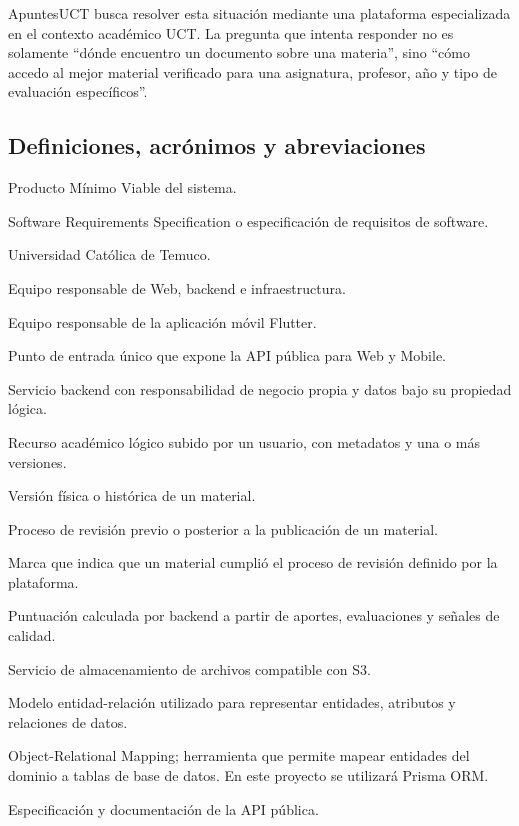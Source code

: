 \documentclass[12pt,a4paper]{article}
\begin{document}
ApuntesUCT busca resolver esta situación mediante una plataforma especializada en el contexto académico UCT. La pregunta que intenta responder no es solamente ``dónde encuentro un documento sobre una materia'', sino ``cómo accedo al mejor material verificado para una asignatura, profesor, año y tipo de evaluación específicos''.

\subsection{Definiciones, acrónimos y abreviaciones}

\begin{description}[leftmargin=3.4cm, style=nextline]
    \item[MVP] Producto Mínimo Viable del sistema.
    \item[SRS] Software Requirements Specification o especificación de requisitos de software.
    \item[UCT] Universidad Católica de Temuco.
    \item[INT2] Equipo responsable de Web, backend e infraestructura.
    \item[INT4] Equipo responsable de la aplicación móvil Flutter.
    \item[API Gateway] Punto de entrada único que expone la API pública para Web y Mobile.
    \item[Microservicio] Servicio backend con responsabilidad de negocio propia y datos bajo su propiedad lógica.
    \item[Material] Recurso académico lógico subido por un usuario, con metadatos y una o más versiones.
    \item[MaterialVersion] Versión física o histórica de un material.
    \item[Moderación] Proceso de revisión previo o posterior a la publicación de un material.
    \item[Verificación] Marca que indica que un material cumplió el proceso de revisión definido por la plataforma.
    \item[Reputación] Puntuación calculada por backend a partir de aportes, evaluaciones y señales de calidad.
    \item[MinIO] Servicio de almacenamiento de archivos compatible con S3.
    \item[MER] Modelo entidad-relación utilizado para representar entidades, atributos y relaciones de datos.
    \item[ORM] Object-Relational Mapping; herramienta que permite mapear entidades del dominio a tablas de base de datos. En este proyecto se utilizará Prisma ORM.
    \item[OpenAPI/Swagger] Especificación y documentación de la API pública.
\end{description}
\end{document}
